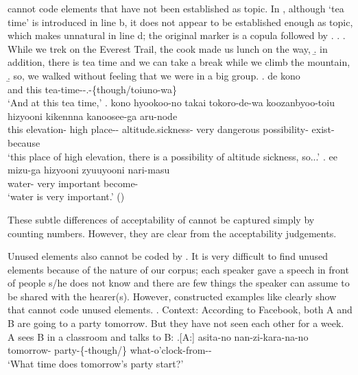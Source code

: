  cannot code elements that have not been established as topic.
In \Next,
although `tea time' is introduced in line b,
it does not appear to be established enough as topic,
which makes  unnatural in line d;
the original marker is a copula followed by .
%
\ex.\label{thii-taimu}
 \a. While we trek on the Everest Trail, the cook made us lunch on the way,
 \b. in addition, there is tea time and we can take a break while we climb the mountain,
 \b. so, we walked without feeling that we were in a big group.
 \bg. de kono  \\
		and this tea-time--.-\{though/toiuno-wa\} \\
		`And at this tea time,'
 \bg. kono hyookoo-no {takai} {tokoro-de-wa} koozanbyoo-toiu hizyooni {kikennna} {kanoosee-ga} aru-node \\
		this elevation- high place-- altitude.sickness- very dangerous possibility- exist-because \\
		`this place of high elevation, there is a possibility of altitude sickness, so...'
 \bg. ee {mizu-ga} hizyooni zyuuyooni nari-masu \\
		 water- very important become- \\
		`water is very important.'
		 \hfill{()}

These subtle differences of acceptability of  cannot be captured simply by counting numbers.
However, they are clear from the acceptability judgements.

Unused elements also cannot be coded by .
It is very difficult to find unused elements
because of the nature of our corpus;
each speaker gave a speech in front of people s/he does not know
and there are few things the speaker can assume to be shared with the hearer(s).
However, constructed examples like \Next clearly show that  cannot code unused elements.
%
\ex. \label{FacebookParty}Context: According to Facebook, both A and B are going to a party tomorrow. But they have not seen each other for a week. A sees B in a classroom and talks to B:
	\a.[A:] asita-no  nan-zi-kara-na-no \\
		tomorrow- party-\{-though/\} what-o'clock-from-- \\
		`What time does tomorrow's party start?' 

